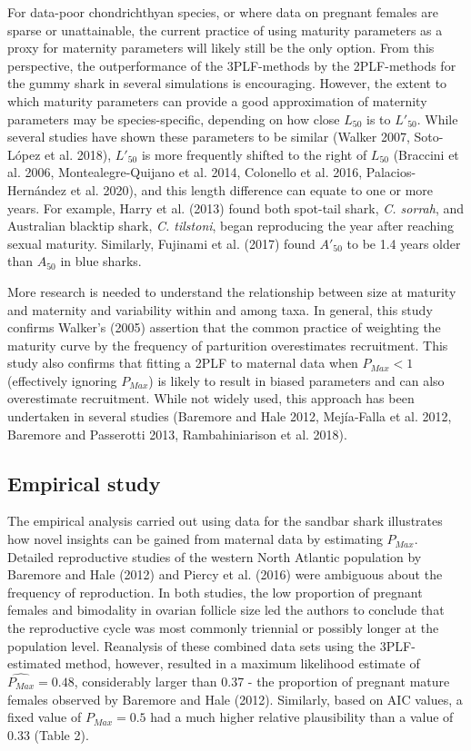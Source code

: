 \documentclass[
]{article}
\begin{document}
For data-poor chondrichthyan species, or where data on pregnant females are sparse or unattainable, the current practice of using maturity parameters as a proxy for maternity parameters will likely still be the only option. From this perspective, the outperformance of the 3PLF-methods by the 2PLF-methods for the gummy shark in several simulations is encouraging. However, the extent to which maturity parameters can provide a good approximation of maternity parameters may be species-specific, depending on how close \(L_{50}\) is to \(L'_{50}\). While several studies have shown these parameters to be similar (Walker 2007, Soto-López et al. 2018), \(L'_{50}\) is more frequently shifted to the right of \(L_{50}\) (Braccini et al. 2006, Montealegre-Quijano et al. 2014, Colonello et al. 2016, Palacios-Hernández et al. 2020), and this length difference can equate to one or more years. For example, Harry et al. (2013) found both spot-tail shark, \emph{C. sorrah}, and Australian blacktip shark, \emph{C. tilstoni}, began reproducing the year after reaching sexual maturity. Similarly, Fujinami et al. (2017) found \(A'_{50}\) to be 1.4 years older than \(A_{50}\) in blue sharks.

More research is needed to understand the relationship between size at maturity and maternity and variability within and among taxa. In general, this study confirms Walker's (2005) assertion that the common practice of weighting the maturity curve by the frequency of parturition overestimates recruitment. This study also confirms that fitting a 2PLF to maternal data when \(P_{Max} < 1\) (effectively ignoring \(P_{Max}\)) is likely to result in biased parameters and can also overestimate recruitment. While not widely used, this approach has been undertaken in several studies (Baremore and Hale 2012, Mejía‐Falla et al. 2012, Baremore and Passerotti 2013, Rambahiniarison et al. 2018).

\subsection{Empirical study}\label{empirical-study}

The empirical analysis carried out using data for the sandbar shark illustrates how novel insights can be gained from maternal data by estimating \(P_{Max}\). Detailed reproductive studies of the western North Atlantic population by Baremore and Hale (2012) and Piercy et al. (2016) were ambiguous about the frequency of reproduction. In both studies, the low proportion of pregnant females and bimodality in ovarian follicle size led the authors to conclude that the reproductive cycle was most commonly triennial or possibly longer at the population level. Reanalysis of these combined data sets using the 3PLF-estimated method, however, resulted in a maximum likelihood estimate of \(\widehat{P_{Max}} = 0.48\), considerably larger than 0.37 - the proportion of pregnant mature females observed by Baremore and Hale (2012). Similarly, based on AIC values, a fixed value of \(P_{Max} = 0.5\) had a much higher relative plausibility than a value of 0.33 (Table 2).
\end{document}
